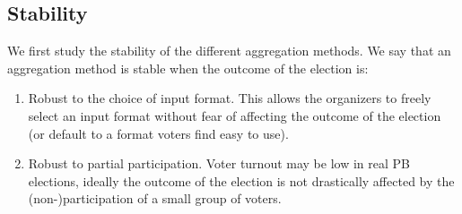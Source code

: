\documentclass[runningheads]{llncs}
\newcommand{\mes}{ES}
\begin{document}

\subsection{Stability} 

 



We first study the   stability of the different aggregation methods. %
We say that an aggregation method is stable when the outcome of the election is:
\begin{enumerate}
\item Robust to the choice of input format. This allows the organizers to freely select an input format without fear of affecting the outcome of the election (or default to a format voters find easy to use). 
\item  Robust to partial participation.   Voter turnout may be low in real PB elections, ideally the outcome of the election is not drastically affected by the (non-)participation of a small group of voters. 
\end{enumerate}
\end{document}
